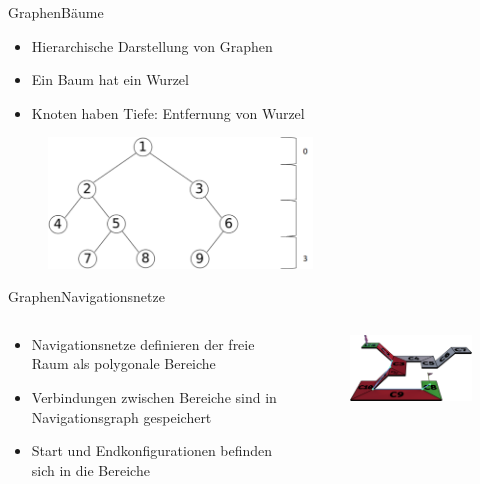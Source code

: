 \documentclass[t,aspectratio=169,dvipsnames]{beamer}
\begin{document}
\begin{frame}{Graphen}{Bäume}
	\begin{itemize}
		\item Hierarchische Darstellung von Graphen
		\item Ein Baum hat ein Wurzel
		\item Knoten haben Tiefe: Entfernung von Wurzel
	\end{itemize}
	
	\begin{figure}
		\includegraphics[width=7.0cm]{images/Bild5.png}
	\end{figure}
\end{frame}
\begin{frame}{Graphen}{Navigationsnetze}
	\begin{columns}
		\begin{column}[T]{0.5\textwidth}
			\begin{itemize}
				\item Navigationsnetze definieren der freie Raum als polygonale Bereiche
				\item Verbindungen zwischen Bereiche sind in Navigationsgraph gespeichert
				\item Start und Endkonfigurationen befinden sich in die Bereiche
			\end{itemize}
		\end{column}
		\begin{column}[T]{0.5\textwidth}
			\begin{figure}
				\includegraphics[width=6.5cm]{images/mesh_with_path.png}
			\end{figure}
		\end{column}
	\end{columns}
\end{frame}
\end{document}
